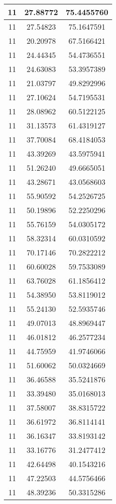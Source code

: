 \documentclass[
]{book}
\begin{document}
\begin{tabular}{c|c|c}
\hline
11 & 27.88772 & 75.4455760\\
\hline
11 & 27.54823 & 75.1647591\\
\hline
11 & 20.20978 & 67.5166421\\
\hline
11 & 24.44345 & 54.4736551\\
\hline
11 & 24.63083 & 53.3957389\\
\hline
11 & 21.03797 & 49.8292996\\
\hline
11 & 27.10624 & 54.7195531\\
\hline
11 & 28.08962 & 60.5122125\\
\hline
11 & 31.13573 & 61.4319127\\
\hline
11 & 37.70084 & 68.4184053\\
\hline
11 & 43.39269 & 43.5975941\\
\hline
11 & 51.26240 & 49.6665051\\
\hline
11 & 43.28671 & 43.0568603\\
\hline
11 & 55.90592 & 54.2526725\\
\hline
11 & 50.19896 & 52.2250296\\
\hline
11 & 55.76159 & 54.0305172\\
\hline
11 & 58.32314 & 60.0310592\\
\hline
11 & 70.17146 & 70.2822212\\
\hline
11 & 60.60028 & 59.7533089\\
\hline
11 & 63.76028 & 61.1856412\\
\hline
11 & 54.38950 & 53.8119012\\
\hline
11 & 55.24130 & 52.5935746\\
\hline
11 & 49.07013 & 48.8969447\\
\hline
11 & 46.01812 & 46.2577234\\
\hline
11 & 44.75959 & 41.9746066\\
\hline
11 & 51.60062 & 50.0324669\\
\hline
11 & 36.46588 & 35.5241876\\
\hline
11 & 33.39480 & 35.0168013\\
\hline
11 & 37.58007 & 38.8315722\\
\hline
11 & 36.61972 & 36.8114141\\
\hline
11 & 36.16347 & 33.8193142\\
\hline
11 & 33.16776 & 31.2477412\\
\hline
11 & 42.64498 & 40.1543216\\
\hline
11 & 47.22503 & 44.5756466\\
\hline
11 & 48.39236 & 50.3315286\\

\end{tabular}
\end{document}
